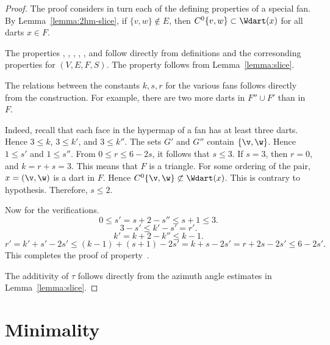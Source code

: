 \begin{proof} The proof considers in turn each of the defining properties of a
  special fan.  By Lemma~\ref{lemma:2hm-slice}, if
  $\{v,w\}\not\in E$, then $C^0\{v,w\}\subset \Wdart(x)$ for all darts
  $x\in F$.

The properties , , ,
, , and  follow directly from
definitions and the corresonding properties for $(V,E,F,S)$.  The
property  follows from Lemma~\ref{lemma:slice}.

The relations between the constants $k,s,r$ for the various fans
follows directly from the construction.  For example, there are two
more darts in $F''\cup F'$ than in $F$.

  Indeed, recall that each face
in the hypermap of a fan has at least three darts.  Hence $3\le k$,
$3\le k'$, and $3\le k''$.  The sets $G'$ and $G''$ contain
$\{\v,\w\}$.  Hence $1\le s'$ and $1\le s''$.  From $0\le r\le 6 -
2s$, it follows that $s\le 3$.  If $s=3$, then $r=0$, and $k=r+s=3$.
This means that $F$ is a triangle.  For some ordering of the pair,
$x=(\v,\w)$ is a dart in $F$.  Hence $C^0\{\v,\w\} \not\subset
\Wdart(x)$.  This is contrary to hypothesis.  Therefore, $s\le 2$.

Now for the verifications.
\begin{displaymath}0\le s' = s + 2 - s'' \le s+1\le 3.\end{displaymath}
\begin{displaymath}3-s'\le k'-s' = r'.\end{displaymath}
\begin{displaymath}k' = k + 2 - k'' \le k-1.\end{displaymath}
\begin{displaymath}
  r'= k'+s' - 2 s' \le (k-1) + (s+1) - 2s' 
  =k+s - 2s' = r + 2s -2s' \le 6 - 2s'.
\end{displaymath}
This completes the proof of property~.

The additivity of $\tau$ follows directly from the azimuth angle
estimates in Lemma~\ref{lemma:slice}.
\end{proof}


\section{Minimality}


